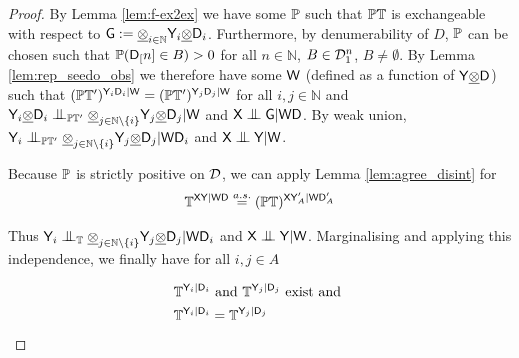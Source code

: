\begin{proof}
By Lemma \ref{lem:f-ex2ex} we have some $\mathbb{P}$ such that $\mathbb{P}\mathbb{T}$ is exchangeable with respect to $\mathsf{G}:=\underline{\otimes}_{i\in\mathbb{N}} \mathsf{Y}_i\underline{\otimes}\mathsf{D}_i$. Furthermore, by denumerability of $D$, $\mathbb{P}$ can be chosen such that $\mathbb{P}(\mathsf{D}_[n]\in B)>0$ for all $n\in\mathbb{N}$, $B\in \mathcal{D}_1^n$, $B\neq \emptyset$. By Lemma \ref{lem:rep_seedo_obs} we therefore have some $\mathsf{W}$ (defined as a function of $\mathsf{Y}\underline{\otimes} \mathsf{D}$) such that $(\mathbb{P}\mathbb{T}')^{\mathsf{Y}_i\mathsf{D}_i|\mathsf{W}}=(\mathbb{P}\mathbb{T}')^{\mathsf{Y}_j\mathsf{D}_j|\mathsf{W}}$ for all $i,j\in \mathbb{N}$ and $\RV{Y}_i\utimes\RV{D}_i\CI_{\prob{P}\kernel{T}'} \utimes_{j\in\mathbb{N}\setminus\{i\}} \RV{Y}_j \utimes \RV{D}_j | \RV{W}$ and $\RV{X}\CI\RV{G}|\RV{W}\RV{D}$.  By weak union, $\RV{Y}_i\CI_{\prob{P}\kernel{T}'} \utimes_{j\in\mathbb{N}\setminus\{i\}} \RV{Y}_j \utimes \RV{D}_j | \RV{W} \RV{D}_i$ and $\RV{X}\CI\RV{Y}|\RV{W}$.

Because $\mathbb{P}$ is strictly positive on $\mathcal{D}$, we can apply Lemma \ref{lem:agree_disint} for
\begin{align}
    \mathbb{T}^{\mathsf{X}\mathsf{Y}|\mathsf{W}\mathsf{D}} \overset{a.s.}{=} (\mathbb{P}\mathbb{T})^{\mathsf{X}\mathsf{Y}'_A|\mathsf{W}\mathsf{D}'_A}
\end{align}

Thus $\RV{Y}_i\CI_{\kernel{T}} \utimes_{j\in \mathbb{N} \setminus\{i\}} \RV{Y}_j \utimes \RV{D}_j | \RV{W} \RV{D}_i$ and $\RV{X}\CI\RV{Y}|\RV{W}$. Marginalising and applying this independence, we finally have for all $i, j\in A$

\begin{align}
    \mathbb{T}^{\mathsf{Y}_i|\mathsf{D}_i}&\text{ and }\mathbb{T}^{\mathsf{Y}_j|\mathsf{D}_j}\text{ exist and }\\
    \mathbb{T}^{\mathsf{Y}_i|\mathsf{D}_i} &= \mathbb{T}^{\mathsf{Y}_j|\mathsf{D}_j}
\end{align}
\end{proof}

